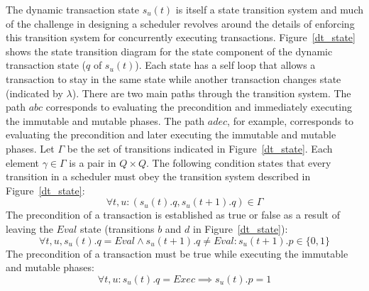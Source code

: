 The dynamic transaction state $s_u(t)$ is itself a state transition system and much of the challenge in designing a scheduler revolves around the details of enforcing this transition system for concurrently executing transactions.
Figure~\ref{dt_state} shows the state transition diagram for the state component of the dynamic transaction state ($q$ of $s_u(t)$).
Each state has a self loop that allows a transaction to stay in the same state while another transaction changes state (indicated by $\lambda$).
There are two main paths through the transition system.
The path $abc$ corresponds to evaluating the precondition and immediately executing the immutable and mutable phases.
The path $adec$, for example, corresponds to evaluating the precondition and later executing the immutable and mutable phases.
Let $\Gamma$ be the set of transitions indicated in Figure~\ref{dt_state}.
Each element $\gamma \in \Gamma$ is a pair in $Q \times Q$.
The following condition states that every transition in a scheduler must obey the transition system described in Figure~\ref{dt_state}:
\begin{equation}
  \forall t, u : (s_u(t).q, s_u(t+1).q) \in \Gamma
\end{equation}
The precondition of a transaction is established as true or false as a result of leaving the $\mathit{Eval}$ state (transitions $b$ and $d$ in Figure~\ref{dt_state}):
\begin{equation}
  \label{pre_establish}
  \forall t, u, s_u(t).q = \mathit{Eval} \land s_u(t+1).q \neq \mathit{Eval} : s_u(t+1).p \in \{0,1\}
\end{equation}
The precondition of a transaction must be true while executing the immutable and mutable phases:
\begin{equation}
  \label{pre_true}
  \forall t, u : s_u(t).q = \mathit{Exec} \implies s_u(t).p = 1
\end{equation}

